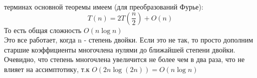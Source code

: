  терминах основной теоремы имеем (для преобразований Фурье):
$$
T(n) = 2T(\frac n 2) + O(n)
$$
То есть общая сложность $O(n \log n)$ \\

 Это все работает, когда n - степень двойки. Если это не так, то просто дополним старшие коэффициенты многочлена нулями до ближайшей степени двойки. Очевидно, что степень многочлена увеличится не более чем в два раза, что не влияет на ассимптотику, т.к $O(2 n \log(2 n)) = O(n \log n)$
